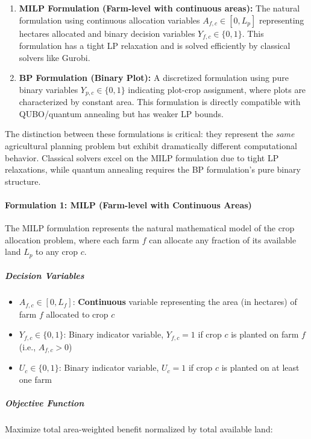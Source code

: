 \documentclass{oqireport}
\begin{document}
\begin{enumerate}
    \item \textbf{MILP Formulation (Farm-level with continuous areas):} The natural formulation using continuous allocation variables $A_{f,c} \in [0, L_p]$ representing hectares allocated and binary decision variables $Y_{f,c} \in \{0,1\}$. This formulation has a tight LP relaxation and is solved efficiently by classical solvers like Gurobi.
    
    \item \textbf{BP Formulation (Binary Plot):} A discretized formulation using pure binary variables $Y_{p,c} \in \{0,1\}$ indicating plot-crop assignment, where plots are characterized by constant area. This formulation is directly compatible with QUBO/quantum annealing but has weaker LP bounds.
\end{enumerate}

The distinction between these formulations is critical: they represent the \emph{same} agricultural planning problem but exhibit dramatically different computational behavior. Classical solvers excel on the MILP formulation due to tight LP relaxations, while quantum annealing requires the BP formulation's pure binary structure.

\paragraph{Formulation 1: MILP (Farm-level with Continuous Areas)}

The MILP formulation represents the natural mathematical model of the crop allocation problem, where each farm $f$ can allocate any fraction of its available land $L_p$ to any crop $c$.

\subparagraph{Decision Variables}

\begin{itemize}
    \item $A_{f,c} \in [0, L_f]$: \textbf{Continuous} variable representing the area (in hectares) of farm $f$ allocated to crop $c$
    \item $Y_{f,c} \in \{0,1\}$: Binary indicator variable, $Y_{f,c} = 1$ if crop $c$ is planted on farm $f$ (i.e., $A_{f,c} > 0$)
    \item $U_c \in \{0,1\}$: Binary indicator variable, $U_c = 1$ if crop $c$ is planted on at least one farm
\end{itemize}

\subparagraph{Objective Function}

Maximize total area-weighted benefit normalized by total available land:
\end{document}
